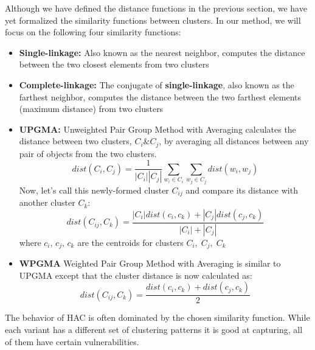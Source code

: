 \documentclass[conference]{IEEEtran}
\begin{document}
Although we have defined the distance functions in the previous section, we have yet formalized the similarity functions between clusters. In our method, we will focus on the following four similarity functions:

\begin{itemize}
	\item \textbf{Single-linkage:} Also known as the nearest neighbor, computes the distance between the two closest elements from two clusters
	\item \textbf{Complete-linkage:} The conjugate of \textbf{single-linkage}, also known as the farthest neighbor, computes the distance between the two farthest elements (maximum distance) from two clusters
	\item \textbf{UPGMA: } Unweighted Pair Group Method with Averaging calculates the distance between two clusters, $C_i \& C_j$, by averaging all distances between any pair of objects from the two clusters.
	\begin{equation*}
		dist(C_i, C_j) = \frac{1}{|C_i||C_j|}\sum_{w_i \in C_i}\sum_{w_j \in C_j}dist(w_i, w_j)
	\end{equation*}
	Now, let's call this newly-formed cluster $C_{ij}$ and compare its distance with another cluster $C_k$:
	\begin{equation*}
		dist(C_{ij}, C_k) =  \frac{|C_i|dist(c_i,c_k) + |C_j|dist(c_j,c_k)}{|C_i|+|C_j|}
	\end{equation*}
	where $c_i,\,c_j,\,c_k$ are the centroids for clusters $C_i,\;C_j,\;C_k$
	\item \textbf{WPGMA} Weighted Pair Group Method with Averaging is similar to UPGMA except that the cluster distance is now calculated as:
	\begin{equation*}
		dist(C_{ij}, C_k) =  \frac{dist(c_i,c_k) + dist(c_j,c_k)}{2}
	\end{equation*}
\end{itemize}

 The behavior of HAC is often dominated by the chosen similarity function. While each variant has a different set of clustering patterns it is good at capturing, all of them have certain vulnerabilities. 
\end{document}
